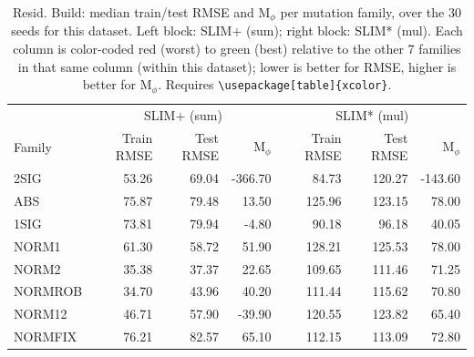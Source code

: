 \begin{table}[t]
\centering
\caption{Resid. Build: median train/test RMSE and M$_\phi$ per mutation family, over the 30 seeds for this dataset. Left block: SLIM+ (sum); right block: SLIM* (mul). Each column is color-coded red (worst) to green (best) relative to the other 7 families in that same column (within this dataset); lower is better for RMSE, higher is better for M$_\phi$. Requires \texttt{\textbackslash usepackage[table]\{xcolor\}}.}
\label{tab:summary-median-performance-resid-build-sale-price}
\begin{tabular}{lrrr|rrr}
\toprule
& \multicolumn{3}{c|}{SLIM+ (sum)} & \multicolumn{3}{c}{SLIM* (mul)} \\
Family & Train RMSE & Test RMSE & M$_\phi$ & Train RMSE & Test RMSE & M$_\phi$ \\
\midrule
2SIG & \cellcolor[HTML]{F6F3A8}53.26 & \cellcolor[HTML]{FDD8A6}69.04 & \cellcolor[HTML]{FAAAA5}-366.70 & \cellcolor[HTML]{AEDBB0}84.73 & \cellcolor[HTML]{FCC5A5}120.27 & \cellcolor[HTML]{FAAAA5}-143.60 \\
ABS & \cellcolor[HTML]{FAACA5}75.87 & \cellcolor[HTML]{FBB5A5}79.48 & \cellcolor[HTML]{C2E1AE}13.50 & \cellcolor[HTML]{FBB2A5}125.96 & \cellcolor[HTML]{FBB7A5}123.15 & \cellcolor[HTML]{AEDBB0}78.00 \\
1SIG & \cellcolor[HTML]{FBB3A5}73.81 & \cellcolor[HTML]{FBB3A5}79.94 & \cellcolor[HTML]{C9E4AD}-4.80 & \cellcolor[HTML]{C3E2AE}90.18 & \cellcolor[HTML]{AEDBB0}96.18 & \cellcolor[HTML]{CAE4AD}40.05 \\
NORM1 & \cellcolor[HTML]{FEE1A6}61.30 & \cellcolor[HTML]{FBF5A7}58.72 & \cellcolor[HTML]{B3DDB0}51.90 & \cellcolor[HTML]{FAAAA5}128.21 & \cellcolor[HTML]{FAAAA5}125.53 & \cellcolor[HTML]{AEDBB0}78.00 \\
NORM2 & \cellcolor[HTML]{B1DCB0}35.38 & \cellcolor[HTML]{AEDBB0}37.37 & \cellcolor[HTML]{BEE0AE}22.65 & \cellcolor[HTML]{FEEBA6}109.65 & \cellcolor[HTML]{FFF3A7}111.46 & \cellcolor[HTML]{B3DDB0}71.25 \\
NORMROB & \cellcolor[HTML]{AEDBB0}34.70 & \cellcolor[HTML]{C6E3AD}43.96 & \cellcolor[HTML]{B8DEAF}40.20 & \cellcolor[HTML]{FEE5A6}111.44 & \cellcolor[HTML]{FDDDA6}115.62 & \cellcolor[HTML]{B4DDB0}70.80 \\
NORM12 & \cellcolor[HTML]{DDEBAB}46.71 & \cellcolor[HTML]{F8F4A8}57.90 & \cellcolor[HTML]{D6E8AC}-39.90 & \cellcolor[HTML]{FCC5A5}120.55 & \cellcolor[HTML]{FBB3A5}123.82 & \cellcolor[HTML]{B8DEAF}65.40 \\
NORMFIX & \cellcolor[HTML]{FAAAA5}76.21 & \cellcolor[HTML]{FAAAA5}82.57 & \cellcolor[HTML]{AEDBB0}65.10 & \cellcolor[HTML]{FEE2A6}112.15 & \cellcolor[HTML]{FEEAA6}113.09 & \cellcolor[HTML]{B2DCB0}72.80 \\
\bottomrule
\end{tabular}
\end{table}

